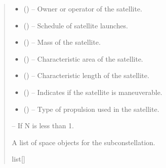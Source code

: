 \documentclass[letterpaper,10pt,english]{sphinxmanual}
\begin{document}
\begin{fulllineitems}
\begin{quote}
\begin{description}
\begin{itemize}
\item {} 
\sphinxAtStartPar
{} () – Owner or operator of the satellite.

\item {} 
\sphinxAtStartPar
{} (\sphinxstyleliteralemphasis{\sphinxupquote{{[}}}\sphinxstyleliteralemphasis{\sphinxupquote{{]}}}) – Schedule of satellite launches.

\item {} 
\sphinxAtStartPar
{} () – Mass of the satellite.

\item {} 
\sphinxAtStartPar
{} () – Characteristic area of the satellite.

\item {} 
\sphinxAtStartPar
{} () – Characteristic length of the satellite.

\item {} 
\sphinxAtStartPar
{} () – Indicates if the satellite is maneuverable.

\item {} 
\sphinxAtStartPar
{} () – Type of propulsion used in the satellite.

\end{itemize}

\sphinxAtStartPar
{} – If N is less than 1.

\sphinxAtStartPar
A list of space objects for the sub\sphinxhyphen{}constellation.

\sphinxAtStartPar
list{[}{\hyperref[\detokenize{fspsim.utils:fspsim.utils.SpaceObject.SpaceObject}]{}}{]}

\end{description}\end{quote}

\end{fulllineitems}
\end{document}

